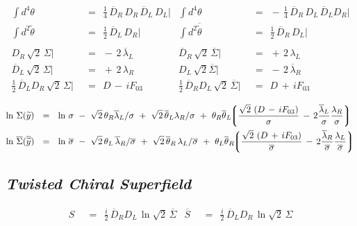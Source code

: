 \documentclass[14pt]{article}
\newcommand{\wt}{\widetilde}
\newcommand{\ov}{\overline}
\newcommand{\lgr}{\left\lgroup}
\newcommand{\rgr}{\right\rgroup}
\begin{document}
\begin{align*}
	\int d^4\theta & ~~=~~ \frac{1}{4}\, \ov D{}_R\, D_R\, \ov D{}_L\, D_L \Big|
	&
	\int d^4\theta & ~~=~~ -\, \frac{1}{4}\, \ov D{}_R\, D_L\, \ov D{}_L D_R \Big|
	\\
	\int d^2\wt\theta & ~~=~~ \frac{1}{2}\, \ov D{}_L\, D_R \Big|
	&
	\int d^2\ov{\wt\theta} & ~~=~~ \frac{1}{2}\, \ov D{}_R\, D_L \Big|
	\\ \\
	D_R\, \sqrt{2}\, \Sigma \Big| & ~~=~~ -\, 2\, \ov\lambda{}_L
	&
	\ov D{}_R\, \sqrt{2}\, \ov\Sigma \Big| & ~~=~~ +\, 2\, \lambda_L
	\\
	\ov D{}_L\, \sqrt{2}\, \Sigma \Big| & ~~=~~ +\, 2\, \lambda_R
	&
	D_L\, \sqrt{2} \ov\Sigma \Big| & ~~=~~ -\, 2\, \ov\lambda{}_R
	\\
	\frac{1}{2}\, \ov D{}_L D_R\, \sqrt{2}\, \Sigma \Big| & ~~=~~ D \,-\, i F_{03}
	&
	\frac{1}{2}\, \ov D{}_R D_L\, \sqrt{2}\, \ov\Sigma \Big| & ~~=~~ D \,+\, i F_{03}
\end{align*}

\begin{align*}
	\ln\, \Sigma(\wt y) & ~~=~~ \ln\,\sigma 
				~-~ \sqrt{2}\, \theta_R \ov\lambda{}_L / \sigma
				~+~ \sqrt{2}\, \ov\theta{}_L \lambda_R / \sigma
				~+~ \theta_R \ov\theta{}_L \!\!
				    \lgr
					\frac{ \sqrt{2}\, \left( D \,-\, i F_{03} \right) }{ \sigma }
					\,-\,
					2 \frac{\ov\lambda{}_L}{\sigma} \frac{\lambda_R}{\sigma}
				    \rgr
	\\
	\ln\, \ov\Sigma(\ov{\wt y}) & ~~=~~ \ln\,\ov\sigma 
				~-~ \sqrt{2}\, \theta_L\, \ov\lambda{}_R / {\ov \sigma}
				~+~ \sqrt{2}\, \ov\theta{}_R\, \lambda_L / {\ov \sigma}
				~+~ \theta_L \ov\theta{}_R \!\!
				    \lgr
					\frac{ \sqrt{2}\, \left( D \,+\, i F_{03} \right) }{ \ov\sigma }
					\,-\,
					2 \frac{\ov \lambda{}_R}{\ov\sigma} \frac{\lambda_L}{\ov\sigma}
				    \rgr
\end{align*}


\pagebreak
\subsection*{\centering \it Twisted Chiral Superfield }

\begin{align*}
%
	S &    ~~=~~    \frac{i}{2}\, \ov D{}_R D_L\, \ln \sqrt{2}\, \ov\Sigma
	&
	\ov S &    ~~=~~    \frac{i}{2}\, \ov D{}_L D_R\, \ln \sqrt{2}\, \Sigma
\end{align*}
\end{document}
